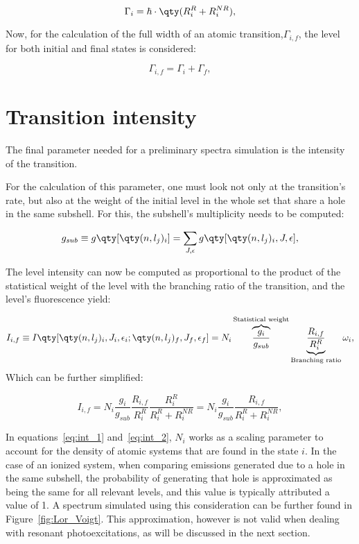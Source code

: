 \begin{equation}
    \Gamma_i = \hbar\cdot \qty(R_i^{R}+R_i^{NR}),
\end{equation}

Now, for the calculation of the full width of an atomic transition,$\Gamma_{i,f}$, the level for both initial and final states is considered:

\begin{equation}
    \Gamma_{i,f}=\Gamma_i+\Gamma_f,
    \label{eq:trans_width}
\end{equation}

\section{Transition intensity}\label{sec:trans_int}

The final parameter needed for a preliminary spectra simulation is the intensity of the transition.

For the calculation of this parameter, one must look not only at the transition's rate, but also at the weight of the  initial level in the whole set that share a hole in the same subshell. For this, the subshell's multiplicity needs to be computed:

\begin{equation}
    g_{sub}\equiv g\qty[\qty(n,l_j)_i]=\sum_{J,\epsilon}g\qty[\qty(n,l_j)_i,J,\epsilon],
\end{equation}

The level intensity can now be computed as proportional to the product of the statistical weight of the level with the branching ratio of the transition, and the level's fluorescence yield:

\begin{equation}
    I_{i,f}\equiv I\qty[\qty(n,l_j)_i,J_i,\epsilon_i;\qty(n,l_j)_f,J_f,\epsilon_f]=N_i \overbrace{\frac{g_i}{g_{sub}}}^{\text{Statistical weight}} \underbrace{\frac{R_{i,f}}{R^R_i}}_{\text{Branching ratio}}  \omega_i, \label{eq:int_1}
\end{equation}
 Which can be further simplified:

 \begin{equation}
    I_{i,f}=N_i \frac{g_i}{g_{sub}} \frac{R_{i,f}}{R_i^R} \frac{R_i^R}{R_i^R + R_i^{NR}}=N_i \frac{g_i}{g_{sub}} \frac{R_{i,f}}{R_i^R+R_i^{NR}}, \label{eq:int_2}
 \end{equation}

 In equations~\eqref{eq:int_1} and~\eqref{eq:int_2}, $N_i$ works as a scaling parameter to account for the density of atomic systems that are found in the state $i$. In the case of an ionized system, when comparing emissions generated due to a hole in the same subshell, the probability of generating that hole is approximated as being the same for all relevant levels, and this value is typically attributed a value of 1. A spectrum simulated using this consideration can be further found in Figure~\ref{fig:Lor_Voigt}. This approximation, however is not valid when dealing with resonant photoexcitations, as will be discussed in the next section.
 